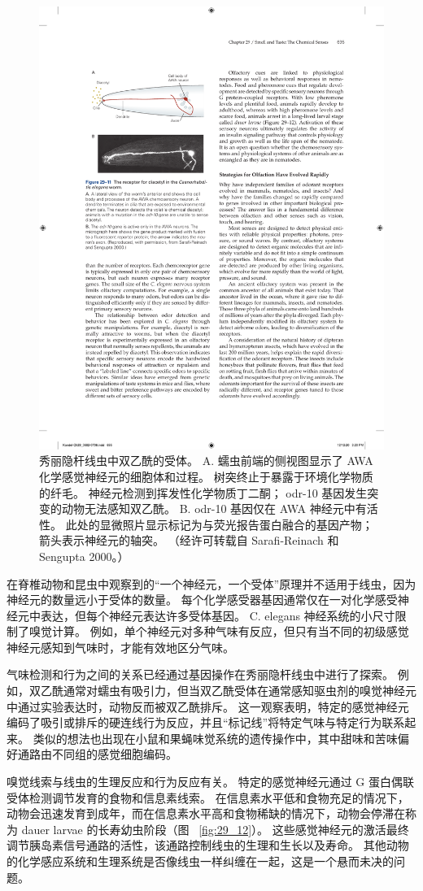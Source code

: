 \begin{figure}[htbp]
	\centering
	\includegraphics[width=0.5\linewidth]{chap29/fig_29_11}
	\caption{秀丽隐杆线虫中双乙酰的受体。 A. 蠕虫前端的侧视图显示了 AWA 化学感觉神经元的细胞体和过程。 树突终止于暴露于环境化学物质的纤毛。 神经元检测到挥发性化学物质丁二酮； odr-10 基因发生突变的动物无法感知双乙酰。 B. odr-10 基因仅在 AWA 神经元中有活性。 此处的显微照片显示标记为与荧光报告蛋白融合的基因产物； 箭头表示神经元的轴突。 （经许可转载自 Sarafi-Reinach 和 Sengupta 2000。）}
	\label{fig:29_11}
\end{figure}


在脊椎动物和昆虫中观察到的“一个神经元，一个受体”原理并不适用于线虫，因为神经元的数量远小于受体的数量。
每个化学感受器基因通常仅在一对化学感受神经元中表达，但每个神经元表达许多受体基因。
C. elegans 神经系统的小尺寸限制了嗅觉计算。
例如，单个神经元对多种气味有反应，但只有当不同的初级感觉神经元感知到气味时，才能有效地区分气味。


气味检测和行为之间的关系已经通过基因操作在秀丽隐杆线虫中进行了探索。
例如，双乙酰通常对蠕虫有吸引力，但当双乙酰受体在通常感知驱虫剂的嗅觉神经元中通过实验表达时，动物反而被双乙酰排斥。
这一观察表明，特定的感觉神经元编码了吸引或排斥的硬连线行为反应，并且“标记线”将特定气味与特定行为联系起来。
类似的想法也出现在小鼠和果蝇味觉系统的遗传操作中，其中甜味和苦味偏好通路由不同组的感觉细胞编码。


嗅觉线索与线虫的生理反应和行为反应有关。
特定的感觉神经元通过 G 蛋白偶联受体检测调节发育的食物和信息素线索。
在信息素水平低和食物充足的情况下，动物会迅速发育到成年，而在信息素水平高和食物稀缺的情况下，动物会停滞在称为 dauer larvae 的长寿幼虫阶段（图 ~\ref{fig:29_12}）。
这些感觉神经元的激活最终调节胰岛素信号通路的活性，该通路控制线虫的生理和生长以及寿命。
其他动物的化学感应系统和生理系统是否像线虫一样纠缠在一起，这是一个悬而未决的问题。


